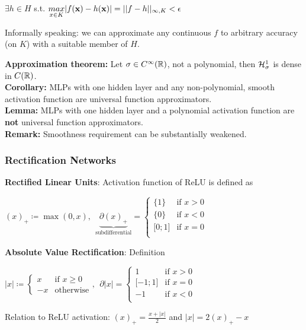         $\exists h \in H$ s.t. $\underset{x\in K}{max}|f(\mathbf x)-h(\mathbf x)|=||f-h||_{\infty, K}<\epsilon$
        
        Informally speaking: we can approximate any continuous $f$ to arbitrary accuracy (on $K$) with a suitable member of $H$.
        
        \textbf{Approximation theorem:} Let $\sigma\in C^{\infty}(\mathbb R)$, not a polynomial, then $\mathcal{H}^1_{\sigma}$ is dense in $C(\mathbb R)$.\\
        \textbf{Corollary:} MLPs with one hidden layer and any non-polynomial, smooth activation function are universal function approximators.\\
        \textbf{Lemma:} MLPs with one hidden layer and a polynomial activation function are \textbf{not} universal function approximators.\\
        \textbf{Remark:} Smoothness requirement can be substantially weakened.
        
    \subsubsection{Rectification Networks}
    \label{ssub:rectificationnetworks}
        \textbf{Rectified Linear Units}: Activation function of ReLU is defined as
        
        \tab$(x)_+\coloneqq\max(0,x),\>\> \underbrace{\partial(x)_+}_{\text{subdifferential}}=\begin{cases}\{1\} & \text{if } x > 0\\\{0\}&\text{if }x<0\\\lbrack0;1\rbrack&\text{if }x=0\\
        \end{cases}$
        
        \textbf{Absolute Value Rectification}: Definition
        
        \tab${\lvert}x\rvert\coloneqq\begin{cases}x&\text{if }x\geq0\\-x&\text{otherwise}\end{cases},\>\> \partial{\lvert}x\rvert=\begin{cases}1 & \text{if } x > 0\\\lbrack-1;1\rbrack&\text{if }x=0\\-1&\text{if }x<0\\
        \end{cases}$
        
        Relation to ReLU activation: $(x)_+=\frac{x+{\lvert}x\rvert}{2}$ and ${\lvert}x\rvert=2(x)_+-x$
        
